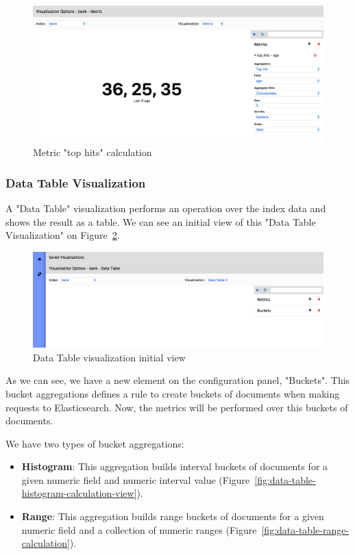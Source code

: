 \documentclass[a4paper, 12pt, english]{book}
\begin{document}
\begin{figure}
  \centering
  \includegraphics[width=13cm, keepaspectratio]{img/metric-top-calculation.png}
  \caption{Metric "top hits" calculation}
  \label{fig:metric-top-calcuation}
\end{figure}

\subsubsection{Data Table Visualization}
\label{sec:data-table-visualization}
A "Data Table" visualization performs an operation over the index data and shows the result as a table. We can see an initial view of this "Data Table Visualization" on Figure~\ref{fig:data-table-initial-view}.
\begin{figure}
  \centering
  \includegraphics[width=13cm, keepaspectratio]{img/data-table-initial-view.png}
  \caption{Data Table visualization initial view}
  \label{fig:data-table-initial-view}
\end{figure}

As we can see, we have a new element on the configuration panel, "Buckets". This bucket aggregations defines a rule to create buckets of documents when making requests to Elasticsearch. Now, the metrics will be performed over this buckets of documents.

We have two types of bucket aggregations:
\begin{itemize}
    \item \textbf{Histogram}: This aggregation builds interval buckets of documents for a given numeric field and numeric interval value (Figure~\ref{fig:data-table-histogram-calculation-view}).
    \item \textbf{Range}: This aggregation builds range buckets of documents for a given numeric field and a collection of numeric ranges (Figure~\ref{fig:data-table-range-calculation}).
\end{itemize}
\end{document}
